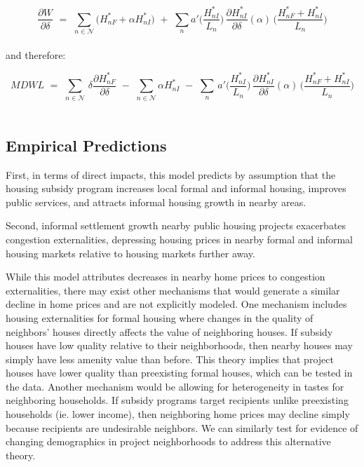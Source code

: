 \documentclass[12pt]{article}
\begin{document}
\begin{equation*}
\frac{\partial W}{\partial\delta} \,\,=\,\, \sum_{n\in\mathcal{N}} \big( H^*_{nF} + \alpha H^*_{nI} \big)  \,\,+\,\, \sum_{n} a'\Big(\frac{H^*_{nI}}{L_n}\Big)\,\frac{\partial H^*_{nI}}{\partial \delta}(\alpha)\,\Big(\frac{H^*_{nF}+H^*_{nI}}{L_n} \Big)
\end{equation*} \\[-1.99em]

 and therefore:

\begin{equation*}
MDWL \,\,=\,\, \sum_{n\in\mathcal{N}} \,\delta\frac{\partial H^*_{nF}}{\partial \delta} \,\,-\,\, \sum_{n\in\mathcal{N}} \alpha H^*_{nI}\,\,-\,\, \sum_{n} \, a'\Big(\frac{H^*_{nI}}{L_n}\Big)\,\frac{\partial H^*_{nI}}{\partial \delta}(\alpha)\,\Big(\frac{H^*_{nF}+H^*_{nI}}{L_n} \Big)
\end{equation*} \\[-1.99em]

\subsection*{Empirical Predictions}

First, in terms of direct impacts, this model predicts by assumption that the housing subsidy program increases local formal and informal housing, improves public services, and attracts informal housing growth in nearby areas.  

Second, informal settlement growth nearby public housing projects exacerbates congestion externalities, depressing housing prices in nearby formal and informal housing markets relative to housing markets further away.  

While this model attributes decreases in nearby home prices to congestion externalities, there may exist other mechanisms that would generate a similar decline in home prices and are not explicitly modeled.  One mechanism includes housing externalities for formal housing where changes in the quality of neighbors' houses directly affects the value of neighboring houses.  If subsidy houses have low quality relative to their neighborhoods, then nearby houses may simply have less amenity value than before.  This theory implies that project houses have lower quality than preexisting formal houses, which can be tested in the data.  Another mechanism would be allowing for heterogeneity in tastes for neighboring households.  If subsidy programs target recipients unlike preexisting households (ie. lower income), then neighboring home prices may decline simply because recipients are undesirable neighbors.  We can similarly test for evidence of changing demographics in project neighborhoods to address this alternative theory. 
\end{document}
